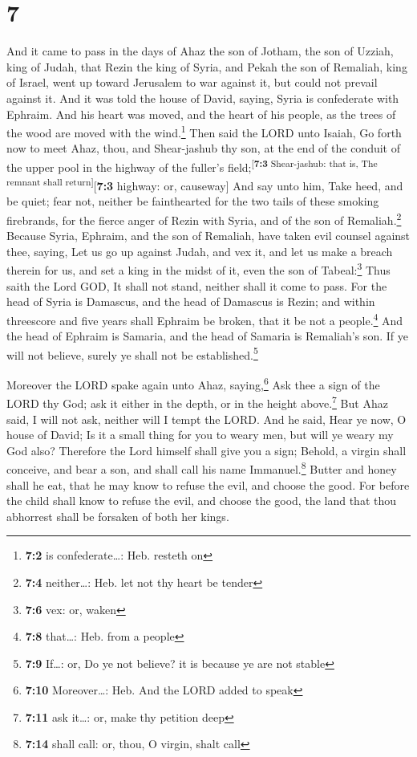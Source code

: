 \hypertarget{section-6}{%
\section{7}\label{section-6}}

 And it came to pass in the days of Ahaz the son of
Jotham, the son of Uzziah, king of Judah, that Rezin the king of Syria,
and Pekah the son of Remaliah, king of Israel, went up toward Jerusalem
to war against it, but could not prevail against it.  And
it was told the house of David, saying, Syria is confederate with
Ephraim. And his heart was moved, and the heart of his people, as the
trees of the wood are moved with the wind.\footnote{\textbf{7:2} is
  confederate\ldots: Heb. resteth on}  Then said the LORD
unto Isaiah, Go forth now to meet Ahaz, thou, and Shear-jashub thy son,
at the end of the conduit of the upper pool in the highway of the
fuller's field;\textsuperscript{{[}\textbf{7:3} Shear-jashub: that is,
The remnant shall return{]}}{[}\textbf{7:3} highway: or, causeway{]}
 And say unto him, Take heed, and be quiet; fear not,
neither be fainthearted for the two tails of these smoking firebrands,
for the fierce anger of Rezin with Syria, and of the son of
Remaliah.\footnote{\textbf{7:4} neither\ldots: Heb. let not thy heart be
  tender}  Because Syria, Ephraim, and the son of
Remaliah, have taken evil counsel against thee, saying, 
Let us go up against Judah, and vex it, and let us make a breach therein
for us, and set a king in the midst of it, even the son of
Tabeal:\footnote{\textbf{7:6} vex: or, waken}  Thus saith
the Lord GOD, It shall not stand, neither shall it come to pass.
 For the head of Syria is Damascus, and the head of
Damascus is Rezin; and within threescore and five years shall Ephraim be
broken, that it be not a people.\footnote{\textbf{7:8} that\ldots: Heb.
  from a people}  And the head of Ephraim is Samaria, and
the head of Samaria is Remaliah's son. If ye will not believe, surely ye
shall not be established.\footnote{\textbf{7:9} If\ldots: or, Do ye not
  believe? it is because ye are not stable}

 Moreover the LORD spake again unto Ahaz,
saying,\footnote{\textbf{7:10} Moreover\ldots: Heb. And the LORD added
  to speak}  Ask thee a sign of the LORD thy God; ask it
either in the depth, or in the height above.\footnote{\textbf{7:11} ask
  it\ldots: or, make thy petition deep}  But Ahaz said, I
will not ask, neither will I tempt the LORD.  And he
said, Hear ye now, O house of David; Is it a small thing for you to
weary men, but will ye weary my God also?  Therefore the
Lord himself shall give you a sign; Behold, a virgin shall conceive, and
bear a son, and shall call his name Immanuel.\footnote{\textbf{7:14}
  shall call: or, thou, O virgin, shalt call}  Butter and
honey shall he eat, that he may know to refuse the evil, and choose the
good.  For before the child shall know to refuse the
evil, and choose the good, the land that thou abhorrest shall be
forsaken of both her kings.

